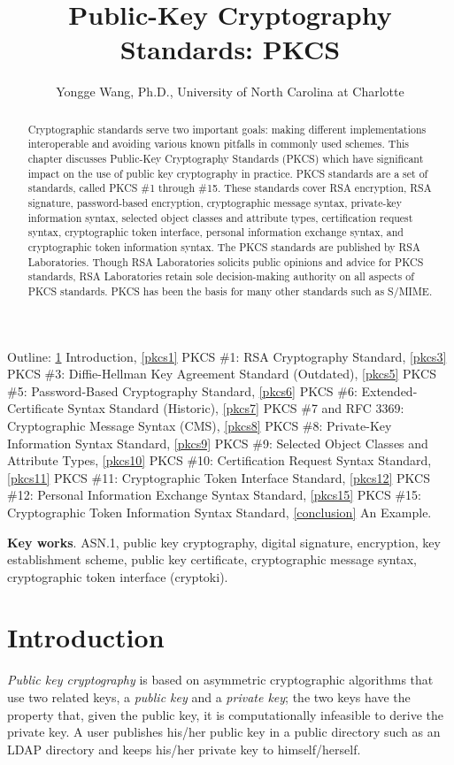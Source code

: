 \documentclass{article}
\begin{document}
\title{Public-Key Cryptography Standards: PKCS}
\author{Yongge Wang, Ph.D., University of North Carolina at Charlotte}

\date{}
\maketitle
{\small
Outline: 
\ref{Intro} Introduction, 
\ref{pkcs1} PKCS \#1: RSA Cryptography Standard, 
\ref{pkcs3} PKCS \#3: Diffie-Hellman Key Agreement Standard (Outdated),
\ref{pkcs5} PKCS \#5: Password-Based Cryptography Standard,
\ref{pkcs6} PKCS \#6: Extended-Certificate Syntax Standard (Historic),
\ref{pkcs7} PKCS \#7 and RFC 3369: Cryptographic Message Syntax (CMS),
\ref{pkcs8} PKCS \#8: Private-Key Information Syntax Standard,
\ref{pkcs9} PKCS \#9: Selected Object Classes and Attribute Types,
\ref{pkcs10} PKCS \#10: Certification Request Syntax Standard,
\ref{pkcs11} PKCS \#11: Cryptographic Token Interface Standard,
\ref{pkcs12} PKCS \#12: Personal Information Exchange Syntax Standard,
\ref{pkcs15} PKCS \#15: Cryptographic Token Information Syntax Standard,
\ref{conclusion} An Example.}

{\bf Key works}. ASN.1, public key cryptography, digital signature, 
encryption, key establishment scheme,
public key certificate, cryptographic message syntax, 
cryptographic token interface (cryptoki).
\begin{abstract}
Cryptographic standards serve two important goals:
making different implementations interoperable and avoiding various
known pitfalls in commonly used schemes.
This chapter discusses Public-Key Cryptography Standards  (PKCS)
which have significant impact on the use of public key cryptography
in practice. PKCS standards are a set of standards,
called PKCS \#1 through \#15. 
These standards cover RSA encryption, RSA signature,
password-based encryption, cryptographic message syntax, 
private-key information syntax, selected object classes and attribute 
types, certification request syntax,
cryptographic token interface, personal information exchange
syntax, and cryptographic token information syntax.
The PKCS standards are published by RSA Laboratories.
Though RSA Laboratories solicits public opinions and advice for 
PKCS standards, RSA Laboratories retain sole decision-making 
authority on all aspects of PKCS standards. PKCS has been the
basis for many other standards such as S/MIME.
\end{abstract}

\section{Introduction}
\label{Intro}
{\em Public key cryptography} is based on
asymmetric cryptographic algorithms that use two related keys,
a {\em public key} and a {\em private key}; the two keys have the property
that, given the public key, it is computationally infeasible
to derive the private key. A user publishes his/her public key in a 
public directory such as an LDAP directory and keeps his/her private
key to himself/herself. 
\end{document}

